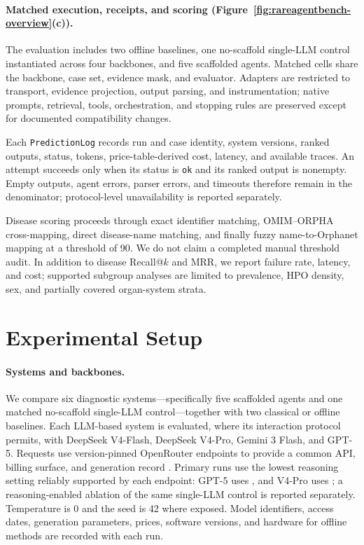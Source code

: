 \documentclass[letterpaper]{article} %
\begin{document}
\paragraph{Matched execution, receipts, and scoring
(Figure~\ref{fig:rareagentbench-overview}(c)).}
The evaluation includes two offline baselines, one no-scaffold single-LLM
control instantiated across four backbones, and five scaffolded agents.
Matched cells share the backbone, case set, evidence mask, and evaluator.
Adapters are restricted to transport, evidence projection, output parsing,
and instrumentation; native prompts, retrieval, tools, orchestration, and
stopping rules are preserved except for documented compatibility changes.

Each \texttt{PredictionLog} records run and case identity, system versions,
ranked outputs, status, tokens, price-table-derived cost, latency, and
available traces. An attempt succeeds only when its status is \texttt{ok} and
its ranked output is nonempty. Empty outputs, agent errors, parser errors, and
timeouts therefore remain in the denominator; protocol-level unavailability
is reported separately.

Disease scoring proceeds through exact identifier matching, OMIM--ORPHA
cross-mapping, direct disease-name matching, and finally fuzzy
name-to-Orphanet mapping at a threshold of 90. We do not claim a completed
manual threshold audit. In addition to disease Recall@$k$ and MRR, we report
failure rate, latency, and cost; supported subgroup analyses are limited to
prevalence, HPO density, sex, and partially covered organ-system strata.
\section{Experimental Setup}
\label{sec-5}

\paragraph{Systems and backbones.}
\label{sec-5-2}
We compare six diagnostic systems---specifically five scaffolded agents and
one matched no-scaffold single-LLM control---together with two classical or
offline baselines. Each LLM-based system is evaluated, where its interaction
protocol permits, with DeepSeek V4-Flash, DeepSeek V4-Pro, Gemini 3 Flash, and
GPT-5. Requests use version-pinned OpenRouter endpoints to provide a common
API, billing surface, and generation record
\citep{openrouter2026api}. Primary runs use the lowest reasoning setting
reliably supported by each endpoint: GPT-5 uses
, and V4-Pro uses
; a reasoning-enabled ablation of the same
single-LLM control is reported separately. Temperature is 0 and the seed is
42 where exposed. Model identifiers, access dates, generation parameters,
prices, software versions, and hardware for offline methods are recorded with
each run.
\end{document}
